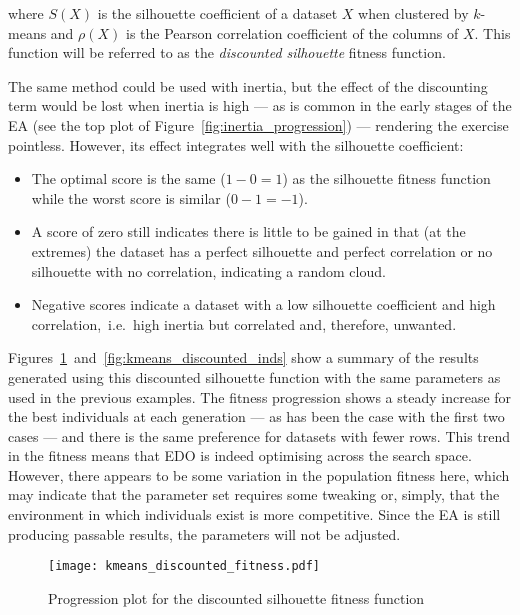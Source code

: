 \noindent where \(S(X)\) is the silhouette coefficient of a dataset \(X\) when
clustered by \(k\)-means and \(\rho(X)\) is the Pearson correlation coefficient
of the columns of \(X\). This function will be referred to as the
\emph{discounted silhouette} fitness function. 

The same method could be used with inertia, but the effect of the discounting
term would be lost when inertia is high --- as is common in the early stages of
the EA (see the top plot of Figure~\ref{fig:inertia_progression}) --- rendering
the exercise pointless. However, its effect integrates well with the silhouette
coefficient:
\begin{itemize}
    \item The optimal score is the same (\(1 - 0 = 1\)) as the silhouette
        fitness function while the worst score is similar (\(0-1=-1\)).
    \item A score of zero still indicates there is little to be gained in that
        (at the extremes) the dataset has a perfect silhouette and perfect
        correlation or no silhouette with no correlation, indicating a random
        cloud.
    \item Negative scores indicate a dataset with a low silhouette coefficient
        and high correlation,~i.e.\ high inertia but correlated and, therefore,
        unwanted.
\end{itemize}

Figures~\ref{fig:discounted_progression}~and~\ref{fig:kmeans_discounted_inds}
show a summary of the results generated using this discounted silhouette
function with the same parameters as used in the previous examples. The fitness
progression shows a steady increase for the best individuals at each generation
--- as has been the case with the first two cases --- and there is the same
preference for datasets with fewer rows. This trend in the fitness means that
EDO is indeed optimising across the search space. However,
there appears to be some variation in the population fitness here, which may
indicate that the parameter set requires some tweaking or, simply, that the
environment in which individuals exist is more competitive. Since the
EA is still producing passable results, the parameters will not be adjusted.

\begin{figure}
    \centering
    \texttt{[image: kmeans\_discounted\_fitness.pdf]}%
    \caption{%
        Progression plot for the discounted silhouette fitness function
    }\label{fig:discounted_progression}
\end{figure}

